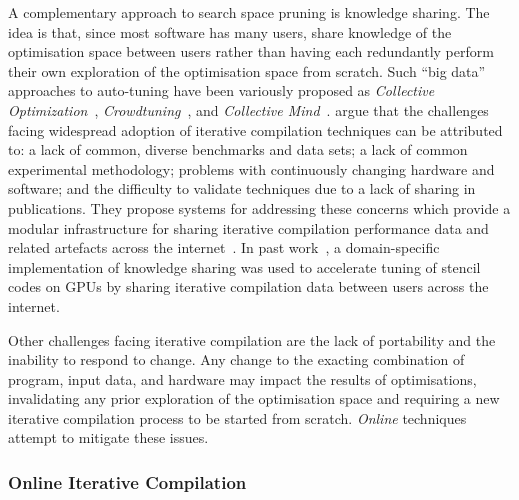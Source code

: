 A complementary approach to search space pruning is knowledge sharing. The idea is that, since most software has many users, share knowledge of the optimisation space between users rather than having each redundantly perform their own exploration of the optimisation space from scratch. Such ``big data'' approaches to auto-tuning have been variously proposed as
\emph{Collective Optimization}~\cite{Saclay2010},
\emph{Crowdtuning}~\cite{Memon2013},
and \emph{Collective Mind}~\cite{Fursin2014}.
\citeauthor{Fursin2014} argue that the challenges facing widespread adoption of iterative compilation techniques can be attributed to: a lack of common, diverse benchmarks and data sets; a lack of common experimental methodology; problems with continuously changing hardware and software; and the difficulty to validate techniques due to a lack of sharing in publications. They propose systems for addressing these concerns which provide a modular infrastructure for sharing iterative compilation performance data and related artefacts across the internet~\cite{Fursin2014}.
In past work~\cite{Cummins2016}, a domain-specific implementation of knowledge sharing was used to accelerate tuning of stencil codes on GPUs by sharing iterative compilation data between users across the internet.

Other challenges facing iterative compilation are the lack of portability and the inability to respond to change. Any change to the exacting combination of program, input data, and hardware may impact the results of optimisations, invalidating any prior exploration of the optimisation space and requiring a new iterative compilation process to be started from scratch. \emph{Online} techniques attempt to mitigate these issues.


\subsubsection{Online Iterative Compilation}

